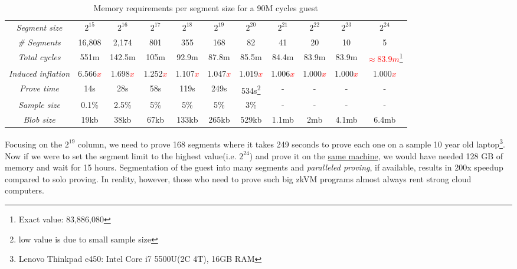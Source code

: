 \documentclass[a4paper, 10pt]{article}
\begin{document}
\begin{table}[H]
  	\begin{center}
    \label{tab:table8}
    \begin{minipage}{\textwidth}
    \begin{adjustbox}{width=\textwidth}
    \begin{tabular}{c|c|c|c|c|c|c|c|c|c|c}
	  \textit{Segment size} & $2^{15}$ & $2^{16}$ & $2^{17}$ & $2^{18}$ & $2^{19}$ & $2^{20}$ & $2^{21}$ & $2^{22}$ & $2^{23}$ & $2^{24}$\\
	  \textit{\# Segments} & 16,808 & 2,174 & 801 & 355 & 168 & 82 & 41 & 20 & 10 & 5\\
	  \textit{Total cycles} & 551m & 142.5m & 105m & 92.9m & 87.8m & 85.5m & 84.4m & 83.9m & 83.9m & \textcolor{red}{$\approx 83.9m$}\footnote{Exact value: 83,886,080}\\
	  \textit{Induced inflation} & 6.566\textcolor{red}{$x$} & 1.698\textcolor{red}{$x$} & 1.252\textcolor{red}{$x$} & 1.107\textcolor{red}{$x$} & 1.047\textcolor{red}{$x$} & 1.019\textcolor{red}{$x$} & 1.006\textcolor{red}{$x$} & 1.000\textcolor{red}{$x$} & 1.000\textcolor{red}{$x$} & 1.000\textcolor{red}{$x$}\\
	  \textit{Prove time} & 14s & 28s & 58s & 119s & 249s & 534s\footnote{low value is due to small sample size} & - & - & - & -\\
	  \textit{Sample size} & 0.1\% & 2.5\% & 5\% & 5\% & 5\% & 3\% & - & - & - & -\\
	  \textit{Blob size} & 19kb & 38kb & 67kb & 133kb & 265kb & 529kb & 1.1mb & 2mb & 4.1mb & 6.4mb\\
   	\end{tabular}
   	\end{adjustbox}
   	\end{minipage}
    \caption{Memory requirements per segment size for a 90M cycles guest}
  \end{center}
\end{table}
Focusing on the $2^{19}$ column, we need to prove 168 segments where it takes 249 seconds to prove each one on a sample 10 year old laptop\footnote{Lenovo Thinkpad e450: Intel Core i7 5500U(2C 4T), 16GB RAM}. Now if we were to set the segment limit to the highest value(i.e. $2^{24}$) and prove it on the \underline{same machine}, we would have needed 128 GB of memory and wait for 15 hours. Segmentation of the guest into many segments and \textit{paralleled proving}, if available, results in 200x speedup compared to solo proving. In reality, however, those who need to prove such big zkVM programs almost always rent strong cloud computers. 
\end{document}
